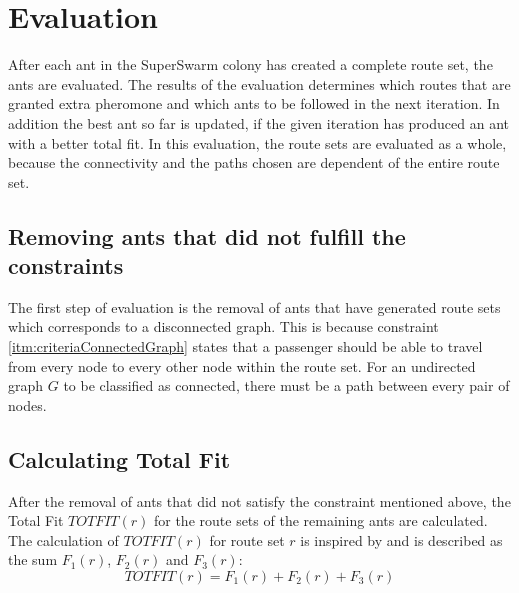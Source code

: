 \section{Evaluation}
\label{sec:algoEvaluation}
After each ant in the SuperSwarm colony has created a complete route set, the ants are evaluated. The results of the evaluation determines which routes that are granted extra pheromone and which ants to be followed in the next iteration. In addition the best ant so far is updated, if the given iteration has produced an ant with a better total fit. In this evaluation, the route sets are evaluated as a whole, because the connectivity and the paths chosen are dependent of the entire route set. 

\subsection{Removing ants that did not fulfill the constraints}
The first step of evaluation is the removal of ants that have generated route sets which corresponds to a disconnected graph. This is because constraint \vref{itm:criteriaConnectedGraph} states that a passenger should be able to travel from every node to every other node within the route set. For an undirected graph $G$ to be classified as connected, there must be a path between every pair of nodes. 

\subsection{Calculating Total Fit}
\label{sec:totfit}
After the removal of ants that did not satisfy the constraint mentioned above, the Total Fit $TOTFIT(r)$ for the route sets of the remaining ants are calculated. The calculation of $TOTFIT(r)$ for route set $r$ is inspired by \citet{kechagiopoulos14} and is described as the sum $F_{1}(r)$, $F_{2}(r)$ and $F_{3}(r)$: 
\newline
$$ TOTFIT(r) = F_{1}(r) + F_{2}(r) + F_{3}(r)$$
